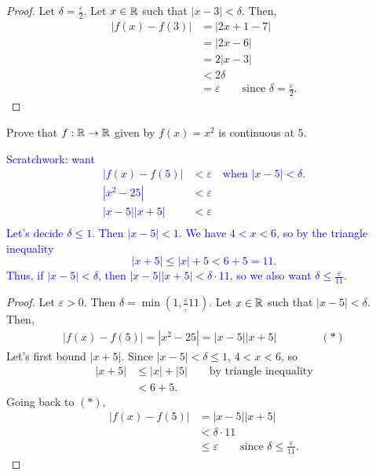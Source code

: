 \begin{proof}
Let $\delta = \frac \varepsilon 2$. Let $x \in \mathbb{R}$ such that $|x - 3| < \delta$. Then,
\begin{align*}
    |f(x) - f(3)| &= |2x + 1 - 7| \\
    &= |2x - 6| \\
    &= 2|x-3| \\
    &< 2\delta \\
    &= \varepsilon \qquad \text{since }\delta = \frac \varepsilon 2.
\end{align*}
\end{proof}

\begin{example}
Prove that $f: \mathbb{R} \to \mathbb{R}$ given by $f(x) = x^2$ is continuous at $5$.
\end{example}

\textcolor{blue}{
Scratchwork: want
\begin{align*}
    |f(x) - f(5)| &< \varepsilon \quad \text{when } |x - 5| < \delta . \\
    |x^2 - 25| &< \varepsilon \\
    |x-5||x+5| &< \varepsilon \\
\end{align*}
Let's decide $\delta \le 1$. Then $|x - 5| < 1$. We have $4 < x < 6$, so by the triangle inequality 
\[
|x + 5| \le |x| + 5 < 6 + 5 = 11.
\]
Thus, if $|x - 5| < \delta$, then $|x - 5||x+5| < \delta \cdot 11$, so we also want $\delta \le \frac{\varepsilon}{11}$.
}
\begin{proof}
Let $\varepsilon > 0$. Then $\delta = \min\left(1, \frac \varepsilon, 11\right)$. Let $x \in \mathbb{R}$ such that $|x - 5| < \delta$. Then,
\begin{align*}
    |f(x) - f(5)| = |x^2 - 25| = |x-5||x+5| \qquad \qquad  (*)
\end{align*}
Let's first bound $|x+5|$. Since $|x-5| < \delta \le 1$, $4 < x < 6$, so
\begin{align*}
    |x+5| &\le |x| + |5| \qquad \text{by triangle inequality}\\
    &< 6+5.
\end{align*}
Going back to $(*)$, 
\begin{align*}
    |f(x) - f(5)| &= |x-5||x+5| \\
    &< \delta \cdot 11 \\
    &\le \varepsilon \qquad \text{since }\delta \le \frac{\varepsilon}{11}.
\end{align*}
\end{proof}

